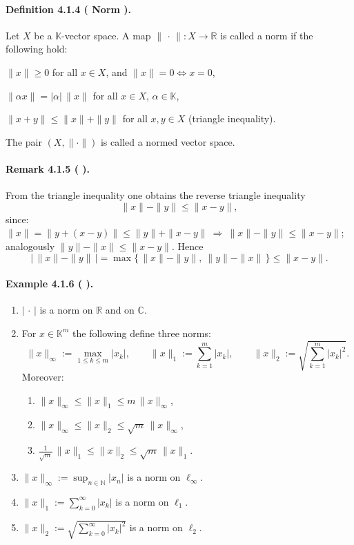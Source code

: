 \documentclass[12pt]{article}
\newcommand{\N}{\mathbb{N}}
\newcommand{\R}{\mathbb{R}}
\newcommand{\C}{\mathbb{C}}
\newcommand{\K}{\mathbb{K}} %
\newcommand{\NumberedDefinition}[3]{%
\paragraph*{Definition #1 ( #2 ).} #3\par}
\newcommand{\NumberedRemark}[3]{%
\paragraph*{Remark #1 ( #2 ).} #3\par}
\newcommand{\NumberedExample}[3]{%
\paragraph*{Example #1 ( #2 ).} #3\par}
\begin{document}
\NumberedDefinition{4.1.4}{Norm}{Let $X$ be a $\K$-vector space. A map $\|\,\cdot\,\| : X\to\R$ is called a norm if the following hold:
\begin{description}[leftmargin=*]
	\item[N1] $\|x\|\ge 0$ for all $x\in X$, \quad and \quad $\|x\|=0 \iff x=0$,
	\item[N2] $\|\alpha x\| = |\alpha|\,\|x\|$ for all $x\in X$, $\alpha\in\K$,
	\item[N3] $\|x+y\| \le \|x\| + \|y\|$ for all $x,y\in X$ (triangle inequality).
\end{description}
The pair $(X,\|\cdot\|)$ is called a normed vector space.}

\NumberedRemark{4.1.5}{}{From the triangle inequality one obtains the reverse triangle inequality
\[
	\|x\| - \|y\| \le \|x-y\|,
\]
since: $\|x\| = \|y + (x-y)\| \le \|y\| + \|x-y\| \ \Rightarrow\ \|x\| - \|y\| \le \|x-y\|$; analogously $\|y\| - \|x\| \le \|x-y\|$. Hence
\[
	\big|\,\|x\| - \|y\|\,\big| = \max\{\,\|x\| - \|y\|,\ \|y\| - \|x\|\,\} \le \|x-y\|.
\]}

\NumberedExample{4.1.6}{}{\begin{enumerate}[label={(\arabic*)}, leftmargin=*]
	\item $|\,\cdot\,|$ is a norm on $\R$ and on $\C$.

	\item For $x\in\K^{m}$ the following define three norms:
	\[
		\|x\|_{\infty} := \max_{1\le k\le m} |x_k|, \qquad
		\|x\|_{1} := \sum_{k=1}^{m} |x_k|, \qquad
		\|x\|_{2} := \sqrt{\sum_{k=1}^{m} |x_k|^{2}}.
	\]
	Moreover:
	\begin{enumerate}[label=\roman*.), leftmargin=2em]
		\item $\|x\|_{\infty} \le \|x\|_{1} \le m\,\|x\|_{\infty}$,
		\item $\|x\|_{\infty} \le \|x\|_{2} \le \sqrt{m}\,\|x\|_{\infty}$,
		\item $\tfrac{1}{\sqrt{m}}\,\|x\|_{1} \le \|x\|_{2} \le \sqrt{m}\,\|x\|_{1}$.
	\end{enumerate}

	\item $\displaystyle \|x\|_{\infty} := \sup_{n\in\N} |x_n|$ is a norm on $\ell_{\infty}$.

	\item $\displaystyle \|x\|_{1} := \sum_{k=0}^{\infty} |x_k|$ is a norm on $\ell_{1}$.

	\item $\displaystyle \|x\|_{2} := \sqrt{\sum_{k=0}^{\infty} |x_k|^{2}}$ is a norm on $\ell_{2}$.
\end{enumerate}}
\end{document}
